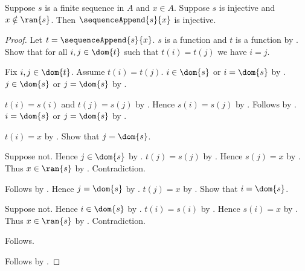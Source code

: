 \begin{proposition}\label{spike_sequence_append_injective_intro}
    Suppose $s$ is a finite sequence in $A$ and $x\in A$.
    Suppose $s$ is injective and $x\notin\ran{s}$.
    Then $\sequenceAppend{s}{x}$ is injective.
\end{proposition}
\begin{proof}
    Let $t=\sequenceAppend{s}{x}$.
    $s$ is a function and $t$ is a function by
        .
    Show that for all $i,j\in\dom{t}$ such that $t(i)=t(j)$ we have
        $i=j$.
    \begin{subproof}
        Fix $i,j\in\dom{t}$.
        Assume $t(i)=t(j)$.
        $i\in\dom{s}$ or $i=\dom{s}$ by
            .
        $j\in\dom{s}$ or $j=\dom{s}$ by
            .
        \begin{byCase}
            $t(i)=s(i)$ and $t(j)=s(j)$ by
                .
            Hence $s(i)=s(j)$ by \auto.
            Follows by .
            $i=\dom{s}$ or $j=\dom{s}$ by \auto.
            \begin{byCase}
                $t(i)=x$ by .
                Show that $j=\dom{s}$.
                \begin{subproof}
                    Suppose not.
                    Hence $j\in\dom{s}$ by \auto.
                    $t(j)=s(j)$ by .
                    Hence $s(j)=x$ by \auto.
                    Thus $x\in\ran{s}$ by .
                    Contradiction.
                \end{subproof}
                Follows by \auto.
                Hence $j=\dom{s}$ by \auto.
                $t(j)=x$ by .
                Show that $i=\dom{s}$.
                \begin{subproof}
                    Suppose not.
                    Hence $i\in\dom{s}$ by \auto.
                    $t(i)=s(i)$ by .
                    Hence $s(i)=x$ by \auto.
                    Thus $x\in\ran{s}$ by .
                    Contradiction.
                \end{subproof}
                Follows.
            \end{byCase}
        \end{byCase}
    \end{subproof}
    Follows by .
\end{proof}

